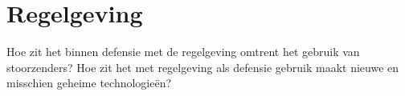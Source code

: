 \documentclass[oneside, a4paper, openany]{memoir}
\begin{document}
\section{Regelgeving}
Hoe zit het binnen defensie met de regelgeving omtrent het gebruik van stoorzenders? Hoe zit het met regelgeving als defensie gebruik maakt nieuwe en misschien geheime technologieën?

\backmatter
\printbibliography





\end{document}
